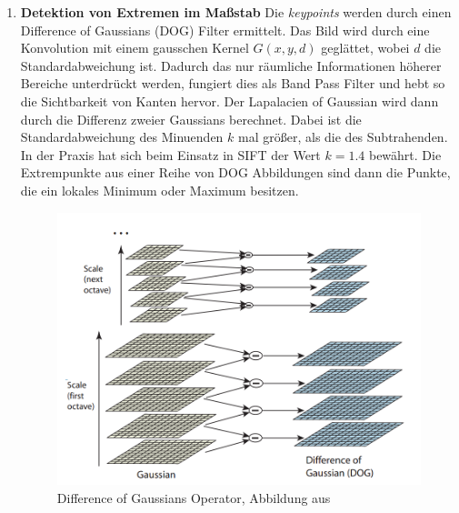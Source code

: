 \begin{enumerate}
	\item \textbf{Detektion von Extremen im Maßstab} Die \textit{keypoints} werden durch einen Difference of Gaussians (DOG) Filter ermittelt. Das Bild wird durch eine Konvolution mit einem gausschen Kernel $G(x, y, d)$ geglättet, wobei $d$ die Standardabweichung ist. Dadurch das nur räumliche Informationen höherer Bereiche unterdrückt werden, fungiert dies als Band Pass Filter und hebt so die Sichtbarkeit von Kanten hervor. Der Lapalacien of Gaussian wird dann durch die Differenz zweier Gaussians berechnet. Dabei ist die Standardabweichung des Minuenden $k$ mal größer, als die des Subtrahenden. In der Praxis hat sich beim Einsatz in SIFT der Wert $k = 1.4$ bewährt. Die Extrempunkte aus einer Reihe von DOG Abbildungen sind dann die Punkte, die ein lokales Minimum oder Maximum besitzen. 
\begin{figure}
	\centering
	\includegraphics[scale=0.5]{images/sift_dog.png}
	\caption{Difference of Gaussians Operator, Abbildung aus \cite{dif2004}}
	\label{img:sift_dog}
\end{figure}	
	

\end{enumerate}
